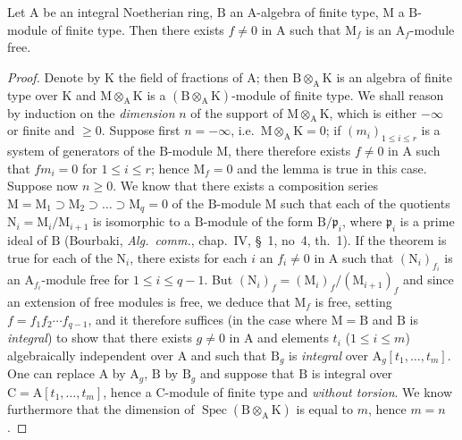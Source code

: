 \begin{lemma}[6.9.2]
\label{IV.6.9.2}
Let $\mathrm{A}$ be an integral Noetherian ring, $\mathrm{B}$ an $\mathrm{A}$-algebra of finite type, $\mathrm{M}$ a $\mathrm{B}$-module of finite type. Then there exists $f\neq 0$ in $\mathrm{A}$ such that $\mathrm{M}_f$ is an $\mathrm{A}_f$-module free.
\end{lemma}

\begin{proof}
Denote by $\mathrm{K}$ the field of fractions of $\mathrm{A}$; then $\mathrm{B}\otimes_\mathrm{A}\mathrm{K}$ is an algebra of finite type over $\mathrm{K}$ and $\mathrm{M}\otimes_\mathrm{A}\mathrm{K}$ is a $(\mathrm{B}\otimes_\mathrm{A}\mathrm{K})$-module of finite type. We shall reason by induction on the \emph{dimension} $n$ of the support of $\mathrm{M}\otimes_\mathrm{A}\mathrm{K}$, which is either $-\infty$ or finite and $\geqslant 0$. Suppose first $n=-\infty$, i.e.\ $\mathrm{M}\otimes_\mathrm{A}\mathrm{K}=0$; if $(m_i)_{1\leqslant i\leqslant r}$ is a system of generators of the $\mathrm{B}$-module $\mathrm{M}$, there therefore exists $f\neq 0$ in $\mathrm{A}$ such that $fm_i=0$ for $1\leqslant i\leqslant r$; hence $\mathrm{M}_f=0$ and the lemma is true in this case. Suppose now $n\geqslant 0$. We know that there exists a composition series $\mathrm{M}=\mathrm{M}_1\supset\mathrm{M}_2\supset\ldots\supset\mathrm{M}_q=0$ of the $\mathrm{B}$-module $\mathrm{M}$ such that each of the quotients $\mathrm{N}_i=\mathrm{M}_i/\mathrm{M}_{i+1}$ is isomorphic to a $\mathrm{B}$-module of the form $\mathrm{B}/\mathfrak{p}_i$, where $\mathfrak{p}_i$ is a prime ideal of $\mathrm{B}$ (Bourbaki, \emph{Alg.\ comm.}, chap.~IV, \S~1, no~4, th.~1). If the theorem is true for each of the $\mathrm{N}_i$, there exists for each $i$ an $f_i\neq 0$ in $\mathrm{A}$ such that $(\mathrm{N}_i)_{f_i}$ is an $\mathrm{A}_{f_i}$-module free for $1\leqslant i\leqslant q-1$. But $(\mathrm{N}_i)_f=(\mathrm{M}_i)_f/(\mathrm{M}_{i+1})_f$  and since an extension of free modules is free, we deduce that $\mathrm{M}_f$ is free, setting $f=f_1f_2\cdots f_{q-1}$, and it therefore suffices (in the case where $\mathrm{M}=\mathrm{B}$ and $\mathrm{B}$ is \emph{integral}) to show that there exists $g\neq 0$ in $\mathrm{A}$ and elements $t_i$ ($1\leqslant i\leqslant m$) algebraically independent over $\mathrm{A}$ and such that $\mathrm{B}_g$ is \emph{integral} over $\mathrm{A}_g[t_1,\ldots,t_m]$. One can replace $\mathrm{A}$ by $\mathrm{A}_g$, $\mathrm{B}$ by $\mathrm{B}_g$ and suppose that $\mathrm{B}$ is integral over $\mathrm{C}=\mathrm{A}[t_1,\ldots,t_m]$, hence a $\mathrm{C}$-module of finite type and \emph{without torsion}. We know furthermore  that the dimension of $\operatorname{Spec}(\mathrm{B}\otimes_\mathrm{A}\mathrm{K})$ is equal to $m$, hence $m=n$.


\end{proof}
